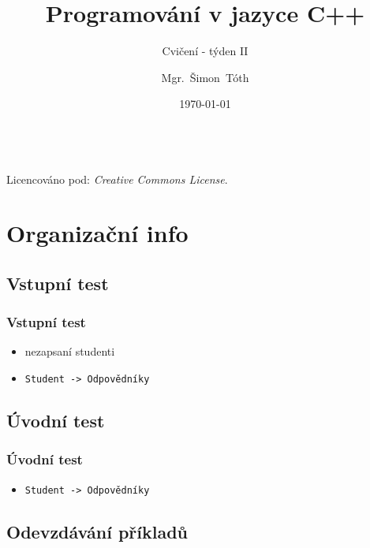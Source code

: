

\title{Programování v jazyce C++}
\subtitle{Cvičení - týden II}
\author[]{Mgr.~Šimon~Tóth}
\date{\today}

\newcommand{\CcNote}[1]{%
        Licencováno pod: \textit{Creative Commons #1 3.0 License}.%
}


        \begin{frame}
                \titlepage
                \vfill
                \begin{center}
                \\
                {\tiny\CcNote{\CcLongnameByNcSa}}
                \vspace*{2ex}
                \end{center}
        \end{frame}

\section{Organizační info}
\subsection{Vstupní test}

\begin{frame}
		\frametitle{Vstupní test}
		\begin{itemize}
				\item{nezapsaní studenti}
				\item{\texttt{Student -> Odpovědníky}}
		\end{itemize}
\end{frame}

\subsection{Úvodní test}

\begin{frame}
	\frametitle{Úvodní test}
	\begin{itemize}
		\item{\texttt{Student -> Odpovědníky}}
	\end{itemize}
\end{frame}

\subsection{Odevzdávání příkladů}

